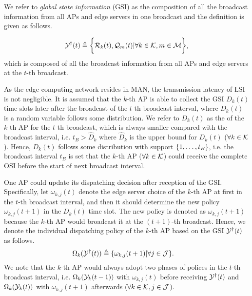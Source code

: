 We refer to \emph{global state information} (GSI) as the composition of all the broadcast information from all APs and edge servers in one broadcast and the definition is given as follows.
\begin{definition}
    \begin{align}
        \mathcal{Y}^{\dagger}(t) \triangleq
            \bigg\{
                \mathcal{R}_{k}({t}), \mathcal{Q}_{m}({t}) | \forall k\in\mathcal{K}, m\in\mathcal{M}
            \bigg\},
    \end{align}
    which is composed of all the broadcast information from all APs and edge servers at the $t$-th broadcast.
\end{definition}

As the edge computing network resides in MAN, the transmission latency of LSI is not negligible.
It is assumed that the $k$-th AP is able to collect the GSI $D_{k}(t)$ time slots later after the broadcast of the $t$-th broadcast interval, where $D_{k}(t)$ is a random variable follows some distribution.
We refer to $D_{k}(t)$ as the \brlatency of the $k$-th AP for the $t$-th broadcast, which is always smaller compared with the broadcast interval, i.e. $t_B > \hat{D}_{k}$ where $\hat{D}_{k}$ is the upper bound for $D_{k}(t)$ ($\forall k\in\mathcal{K}$).
Hence, $D_{k}(t)$ follows some distribution with support $\{1,\dots,t_B\}$, i.e. the broadcast interval $t_B$ is set that the $k$-th AP ($\forall k\in\mathcal{K}$) could receive the complete OSI before the start of next broadcast interval.

One AP could update its dispatching decision after reception of the GSI.
Specifically, let $\omega_{k,j}(t)$ denote the edge server choice of the $k$-th AP at first in the $t$-th broadcast interval, and then it should determine the new policy $\omega_{k,j}(t+1)$ in the $D_{k}(t)$ time slot.
The new policy is denoted as $\omega_{k,j}(t+1)$ because the $k$-th AP would broadcast it at the $(t+1)$-th broadcast.
Hence, we denote the individual dispatching policy of the $k$-th AP based on the GSI $\mathcal{Y}^{\dagger}(t)$ as follows.
\begin{align}
    &\Omega_{k}(\mathcal{Y}^{\dagger}(t)) \triangleq \{\omega_{k,j}(t+1)|\forall j\in\mathcal{J}\}.
    \label{def_action}
\end{align}
We note that the $k$-th AP would always adopt two phases of polices in the $t$-th broadcast interval, i.e. $\Omega_{k}(\mathcal{Y}_{k}({t-1}))$ with $\omega_{k,j}(t)$ before receiving $\mathcal{Y}^{\dagger}(t)$ and $\Omega_{k}(\mathcal{Y}_{k}(t))$ with $\omega_{k,j}(t+1)$ afterwards ($\forall k\in\mathcal{K}, j\in\mathcal{J}$).


